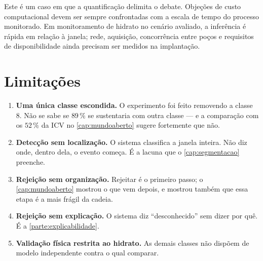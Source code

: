 \begin{destaque}
Este é um caso em que a quantificação delimita o debate. Objeções de custo computacional
devem ser sempre confrontadas com a escala de tempo do processo monitorado. Em
monitoramento de hidrato no cenário avaliado, a inferência é rápida em relação à janela;
rede, aquisição, concorrência entre poços e requisitos de disponibilidade ainda precisam
ser medidos na implantação.
\end{destaque}

\section{Limitações}

\begin{enumerate}[leftmargin=*,itemsep=0.4em]

\item \textbf{Uma única classe escondida.} O experimento foi feito removendo a classe 8.
Não se sabe se $89\,\%$ se sustentaria com outra classe --- e a comparação com os
$52\,\%$ da ICV no \cref{cap:mundoaberto} sugere fortemente que não.

\item \textbf{Detecção sem localização.} O sistema classifica a janela inteira. Não diz
onde, dentro dela, o evento começa. É a lacuna que o \cref{cap:segmentacao} preenche.

\item \textbf{Rejeição sem organização.} Rejeitar é o primeiro passo; o
\cref{cap:mundoaberto} mostrou o que vem depois, e mostrou também que essa etapa é a
mais frágil da cadeia.

\item \textbf{Rejeição sem explicação.} O sistema diz ``desconhecido'' sem dizer por quê.
É a \cref{parte:explicabilidade}.

\item \textbf{Validação física restrita ao hidrato.} As demais classes não dispõem de
modelo independente contra o qual comparar.

\end{enumerate}

